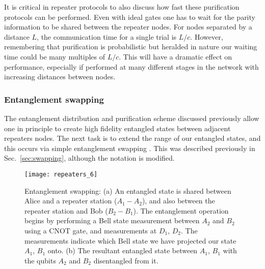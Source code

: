 It is critical in repeater protocols to also discuss how fast these purification protocols can be performed. Even with ideal gates one has to wait for the parity information to be shared between the repeater nodes. For nodes separated by a distance $L$, the communication time for a single trial is $L/c$. However, remembering that purification is probabilistic but heralded in nature our waiting time could be many multiples of $L/c$. This will have a dramatic effect on performance, especially if performed at many different stages in the network with increasing distances between nodes.

\subsubsection{Entanglement swapping}\label{sec:reps_ent_swap}

The entanglement distribution and purification scheme discussed previously allow one in principle to create high fidelity entangled states between adjacent repeaters nodes. The next task is to extend the range of our entangled states, and this occurs via simple entanglement swapping \cite{bib:BDCZ98, bib:Zukowski93, bib:goebel08, bib:Duan01}. This was described previously in Sec.~\ref{sec:swapping}, although the notation is modified.

\begin{figure}[!htb]
\texttt{[image: repeaters\_6]}
\caption{Entanglement swapping: (a) An entangled state is shared between Alice and a repeater station ($A_1-A_2$), and also between the repeater station and Bob ($B_2-B_1$). The entanglement operation begins by performing a Bell state measurement between $A_2$ and $B_2$ using a CNOT gate, and measurements at $D_1$, $D_2$.  The measurements indicate which Bell state we have projected our state $A_1$, $B_1$ onto. (b) The resultant entangled state between $A_1$, $B_1$ with the qubits $A_2$ and $B_2$ disentangled from it.}
\label{fig:repeaters_6}
\end{figure} 

